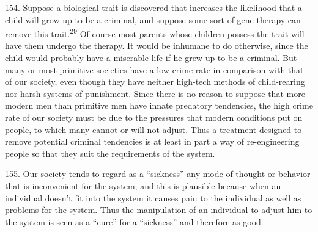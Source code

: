 \documentclass{article}
\begin{document}
154.  Suppose a biological trait is discovered that increases the likelihood that a child will grow up 
to be a criminal, and suppose some sort of gene therapy can remove this trait.\textsuperscript{29} Of course most 
parents whose children possess the trait will have them undergo the therapy.  It would be inhumane 
to  do  otherwise,  since  the  child  would  probably  have  a  miserable  life  if  he  grew  up  to  be  a  
criminal.  But many or most primitive societies have a low crime rate in comparison with that of 
our society, even though they have neither high-tech methods of child-rearing nor harsh systems 
of  punishment.   Since  there  is  no  reason  to  suppose  that  more  modern  men  than  primitive  men  
have innate predatory tendencies, the high crime rate of our society must be due to the pressures 
that modern conditions put on people, to which many cannot or will not adjust.  Thus a treatment 
designed to remove potential criminal tendencies is at least in part a way of re-engineering people 
so that they suit the requirements of the system. \vspace{\baselineskip}

155.  Our  society  tends  to  regard  as  a  “sickness”  any  mode  of  thought  or  behavior  that  is  
inconvenient for the system, and this is plausible because when an individual doesn’t fit into the 
system it causes pain to the individual as well as problems for the system.  Thus the manipulation 
of an individual to adjust him to the system is seen as a “cure” for a “sickness” and therefore as 
good. \vspace{\baselineskip}
\end{document}
